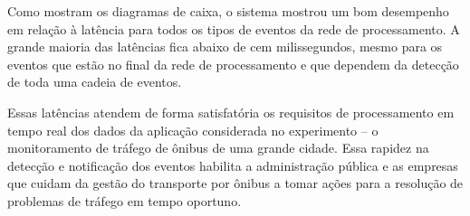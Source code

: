 

  Como mostram os diagramas de caixa, o sistema mostrou um bom desempenho em relação à latência para todos os tipos de eventos da rede de processamento. A grande maioria das latências fica abaixo de cem milissegundos, mesmo para os eventos que estão no final da rede de processamento e que dependem da detecção de toda uma cadeia de eventos. 
  
  Essas latências atendem de forma satisfatória os requisitos de processamento em tempo real dos dados da aplicação considerada no experimento -- o monitoramento de tráfego de ônibus de uma grande cidade. Essa rapidez na detecção e notificação dos eventos habilita a administração pública e as empresas que cuidam da gestão do transporte por ônibus a tomar ações para a resolução de problemas de tráfego em tempo oportuno. 
  



